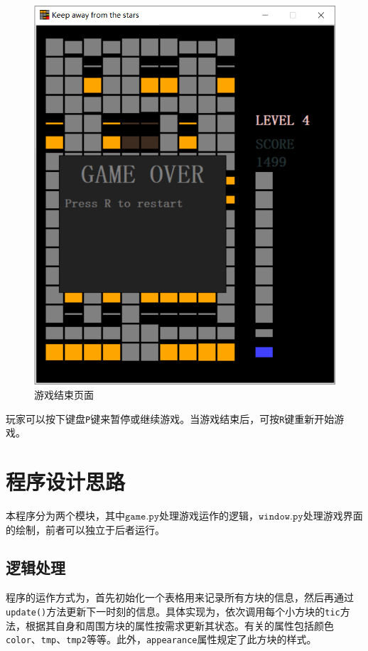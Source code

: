 \documentclass[UTF8]{article}
\begin{document}
\begin{figure}[htbp]
\begin{minipage}[t]{0.48\textwidth}
\includegraphics[scale=0.3]{fig_5.png}
\caption{游戏结束页面}
\end{minipage}
\end{figure}

玩家可以按下键盘\texttt{P}键来暂停或继续游戏。当游戏结束后，可按\texttt{R}键重新开始游戏。

\section{程序设计思路}
本程序分为两个模块，其中$\texttt{game.py}$处理游戏运作的逻辑，$\texttt{window.py}$处理游戏界面的绘制，前者可以独立于后者运行。

\subsection{逻辑处理}

程序的运作方式为，首先初始化一个表格用来记录所有方块的信息，然后再通过\texttt{update()}方法更新下一时刻的信息。具体实现为，依次调用每个小方块的\texttt{tic}方法，根据其自身和周围方块的属性按需求更新其状态。有关的属性包括颜色\texttt{color}、\texttt{tmp}、\texttt{tmp2}等等。此外，\texttt{appearance}属性规定了此方块的样式。
\end{document}
